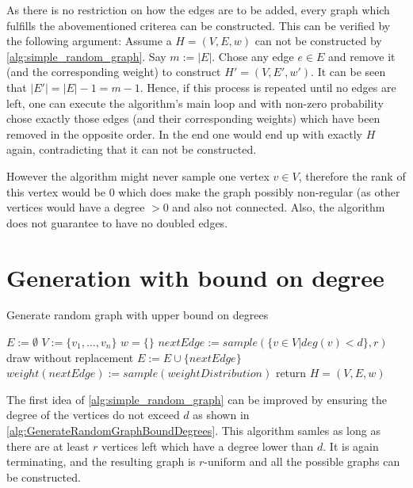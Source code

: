 As there is no restriction on how the edges are to be added, every graph which fulfills the abovementioned criterea can be constructed. This can be verified by the following argument: Assume a $H = (V, E, w)$ can not be constructed by \cref{alg:simple_random_graph}. Say $m:=|E|$. Chose any edge $e \in E$ and remove it (and the corresponding weight) to construct $H' = (V, E', w')$. It can be seen that $|E'|= |E|-1 = m-1 $. Hence, if this process is repeated until no edges are left, one can execute the algorithm's main loop and with non-zero probability chose exactly those edges (and their corresponding weights) which have been removed in the opposite order. In the end one would end up with exactly $H$ again, contradicting that it can not be constructed.



However the algorithm might never sample one vertex $v \in V$, therefore the rank of this vertex would be $0$ which does make the graph possibly non-regular (as other vertices would have a degree $>0$ and also not connected. Also, the algorithm does not guarantee to have no doubled edges.

\section{Generation with bound on degree}
\begin{algorithm}
	\caption{Generate random graph with upper bound on degrees\label{alg:GenerateRandomGraphBoundDegrees}} 
	\begin{algorithmic}
		\State $E := \emptyset$
		\State $V := \{v_1, \ldots, v_n\}$
		\State $w = \{\}$
		\State $nextEdge := sample(\{v\in V| deg(v)< d\}, r) $ \Comment draw without replacement
		\State $E := E \cup \{nextEdge\}$
		\State $weight(nextEdge) := sample(weightDistribution)$ 
		\EndWhile
		\State  return $H = (V, E, w)$
		\EndFunction
	\end{algorithmic}
\end{algorithm}	
The first idea of \cref{alg:simple_random_graph} can be improved by ensuring the degree of the vertices do not exceed $d$ as shown in \cref{alg:GenerateRandomGraphBoundDegrees}. This algorithm samles as long as there are at least $r$ vertices left which have a degree lower than $d$. It is again terminating,  and the resulting graph is $r$-uniform and all the possible graphs can be constructed.

